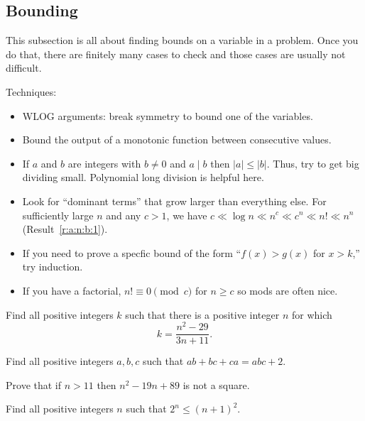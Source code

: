 \subsection{Bounding}
This subsection is all about finding bounds on a variable in a problem. Once you do
that, there are finitely many cases to check and those cases are usually not
difficult.

Techniques:
\begin{itemize}
  \item WLOG arguments: break symmetry to bound one of the variables.
  \item Bound the output of a monotonic function between consecutive values.
  \item If $a$ and $b$ are integers with $b\ne 0$ and $a\mid b$ then
    $|a|\le|b|$. Thus, try to get big dividing small. Polynomial long division
    is helpful here.
  \item Look for ``dominant terms'' that grow larger than everything else. For
    sufficiently large $n$ and any $c>1$, we have $c\ll\log n\ll n^c\ll c^n\ll
    n!\ll n^n$ (Result~\ref{r:a:n:b:1}).
  \item If you need to prove a specfic bound of the form ``$f(x)>g(x)$ for
    $x>k$,'' try induction.
  \item If you have a factorial, $n!\equiv 0\pmod c$ for $n\ge c$ so mods are
    often nice.
\end{itemize}
\begin{problem}{\label{p:i:n:b:1}}
   Find all positive integers $k$ such that there is a positive integer $n$
    for which
    \[k=\frac{n^2-29}{3n+11}.\]
\end{problem}
\begin{problem}{\label{p:i:n:b:2}}
  Find all positive integers $a,b,c$ such that $ab+bc+ca=abc+2$.
\end{problem}
\begin{problem}{\label{p:i:n:b:3}}
  Prove that if $n>11$ then $n^2-19n+89$ is not a square.
\end{problem}
\begin{problem}{\label{p:i:n:b:4}}
  Find all positive integers $n$ such that $2^n\le (n+1)^2$.
\end{problem}
